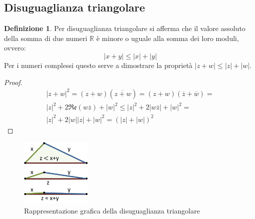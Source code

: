 \documentclass{article}
\theoremstyle{definition}
\newtheorem{definition}{Definizione}[section]
\begin{document}
\subsection{Disuguaglianza triangolare}\label{sec:disuguaglianza_triangolare}
\begin{definition}
        Per disuguaglianza triangolare si afferma che il valore assoluto della somma di due numeri $ \mathbb{R} $ è minore o uguale alla somma dei loro moduli, ovvero:
        \begin{equation*}
                |x + y| \le |x| + |y|
        \end{equation*}
        Per i numeri complessi questo serve a dimostrare la proprietà $ |z+w| \le |z| + |w| $.
        \begin{tcolorbox}
                
        \begin{proof}
                \begin{align*}
                        |z + w|^2 = (z + w)(\overline{z + w}) = (z + w)(\overline{z} + \overline{w}) = \\
                        |z|^2 + 2\mathfrak{Re}(w\overline{z}) + |w|^2 \le |z|^2 + 2|w\overline{z}| + |w|^2 = \\
                        |z|^2 + 2|w| |z| + |w|^2 = {(|z| + |w|)}^{2}
                \end{align*}
        \end{proof}
        \end{tcolorbox}
\end{definition}
\begin{figure}[h]
        \centering
                \includegraphics[width=0.3\textwidth]{disuguaglianza_triangolare.png}
                \caption{Rappresentazione grafica della disuguaglianza triangolare}\label{fig:disuguaglianza_triangolare}
\end{figure}
\end{document}
